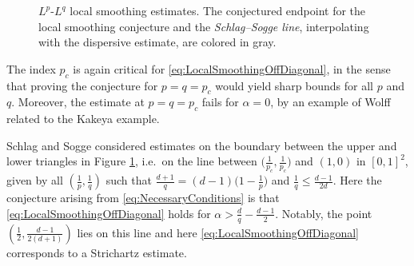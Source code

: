 \documentclass{amsart}
\numberwithin{equation}{section}
\theoremstyle{definition}
\begin{document}
\begin{figure}[ht!]
\label{fig:LocalSmoothing}
\caption{$L^p$-$L^q$ local smoothing estimates. The conjectured endpoint for the local smoothing conjecture and the \emph{Schlag--Sogge line}, interpolating with the dispersive estimate, are colored in gray.}
\end{figure}

The index $p_{c}$ is again critical for \eqref{eq:LocalSmoothingOffDiagonal}, in the sense that proving the conjecture for $p=q=p_{c}$ would yield sharp bounds for all $p$ and $q$. Moreover, the estimate at $p=q=p_c$ fails for $\alpha= 0$, by an example of Wolff related to the Kakeya example.

Schlag and Sogge considered estimates on the boundary between the upper and lower triangles in Figure \ref{fig:LocalSmoothing}, i.e.~on the line between $\big( \frac{1}{p_{c}}, \frac{1}{p_{c}} \big)$ and $(1,0)$ in $[0,1]^{2}$, given by all $(\frac{1}{p},\frac{1}{q})$ such that $\frac{d+1}{q} = (d-1) \big( 1 - \frac{1}{p} \big)$ and $\frac{1}{q} \leq \frac{d-1}{2d}$. Here the conjecture arising from \eqref{eq:NecessaryConditions} is that \eqref{eq:LocalSmoothingOffDiagonal} holds for $\alpha > \frac{d}{q}-\frac{d-1}{2}$. Notably, the %
point $(\frac{1}{2},\frac{d-1}{2(d+1)})$ lies on this line and here \eqref{eq:LocalSmoothingOffDiagonal} corresponds to a Strichartz estimate. 
\end{document}

